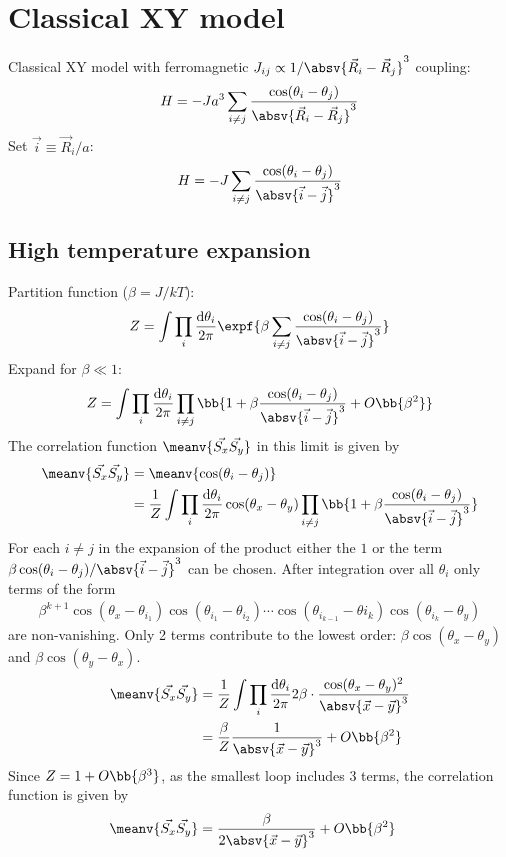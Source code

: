 
\newcommand{\Raij}{\absv{\vec{R}_i-\vec{R}_j}^3}
\newcommand{\aij}{\absv{\vec{i}-\vec{j}}^3}
\newcommand{\suminj}{\sum_{i\ne j}}

\chapter{Classical XY model}

Classical XY model with ferromagnetic $J_{ij} \propto 1/\Raij$ coupling:
\begin{align}
H=-J a^3 \sum_{i\ne j} \frac{\cos(\theta_i - \theta_j)}{\Raij}
\end{align}
Set $\vec{i}\equiv \vec{R}_i/a$:
\begin{align}
H=-J \sum_{i\ne j} \frac{\cos(\theta_i - \theta_j)}{\aij}
\end{align}

\section{High temperature expansion}
Partition function ($\beta = J/kT$):
\begin{align}
Z=\int\prod_{i} \frac{\text{d}\theta_i}{2\pi}  \expf{\beta \suminj \frac{\cos(\theta_i - \theta_j)}{\aij}}
\end{align}
Expand for $\beta \ll 1$:
\begin{align}
Z=\int\prod_{i} \frac{\text{d}\theta_i}{2\pi}  \prod_{i\ne j}  \bb{1 + \beta \frac{\cos(\theta_i - \theta_j)}{\aij} + O\bb{\beta^2}}
\end{align}
The correlation function $\meanv{\vec{S_x} \vec{S_y}}$ in this limit is given by
\begin{align}
\meanv{\vec{S_x} \vec{S_y}} &= \meanv{\cos(\theta_i - \theta_j)} \\ &= \frac{1}{Z} \int\prod_{i} \frac{\text{d}\theta_i}{2\pi}  \cos(\theta_x - \theta_y)
\prod_{i\ne j}  \bb{1 + \beta \frac{\cos(\theta_i - \theta_j)}{\aij}}
\end{align}
For each $i\ne j$ in the expansion of the product either the $1$ or the term $\beta \cos(\theta_i - \theta_j)/\aij$ can be chosen. After integration over all $\theta_i$ only terms of the form
\begin{align}
\beta^{k+1} \cos(\theta_x - \theta_{i_1}) \cos(\theta_{i_1} - \theta_{i_2}) \cdots \cos(\theta_{i_{k-1}}-\theta{i_k})\cos(\theta_{i_k} - \theta_y)
\end{align}
are non-vanishing. Only 2 terms contribute to the lowest order: $\beta \cos(\theta_x - \theta_y)$ and $\beta \cos(\theta_y - \theta_x)$.
\begin{align}
\meanv{\vec{S_x} \vec{S_y}} &= \frac{1}{Z} \int\prod_{i} \frac{\text{d}\theta_i}{2\pi} 2 \beta \cdot \frac{\cos(\theta_x - \theta_y)^2}{\absv{\vec{x}-\vec{y}}^3} \\
&= \frac{\beta}{Z} \frac{1}{\absv{\vec{x}-\vec{y}}^3} + O\bb{\beta^2}
\end{align}
Since $Z = 1+O\bb{\beta^3}$, as the smallest loop includes 3 terms, the correlation function is given by
\begin{align}
\meanv{\vec{S_x} \vec{S_y}} &= \frac{\beta}{2\absv{\vec{x}-\vec{y}}^3} + O\bb{\beta^2}
\end{align}

